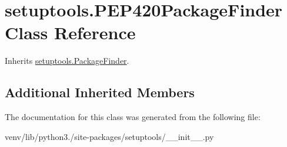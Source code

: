 \hypertarget{classsetuptools_1_1_p_e_p420_package_finder}{}\section{setuptools.\+P\+E\+P420\+Package\+Finder Class Reference}
\label{classsetuptools_1_1_p_e_p420_package_finder}


Inherits \hyperlink{classsetuptools_1_1_package_finder}{setuptools.\+Package\+Finder}.

\subsection*{Additional Inherited Members}


The documentation for this class was generated from the following file\+:\begin{DoxyCompactItemize}
\item 
venv/lib/python3./site-\/packages/setuptools/\+\_\+\+\_\+init\+\_\+\+\_\+.\+py\end{DoxyCompactItemize}
